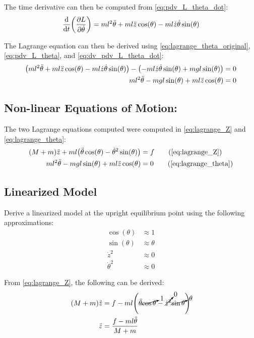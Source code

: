 \documentclass[]{article}
\begin{document}
		The time derivative can then be computed from \eqref{eq:pdv_L_theta_dot}:
		\begin{equation}
			\dv{t} \qty(\pdv{L}{\dot{\theta}}) = m l^2 \ddot{\theta} + m l \ddot{z} \cos(\theta) - m l \dot{z} \dot{\theta} \sin(\theta)
			\label{eq:dv_pdv_L_theta_dot}
		\end{equation}
		
		The Lagrange equation can then be derived using \eqref{eq:lagrange_theta_original}, \eqref{eq:pdv_L_theta}, and \eqref{eq:dv_pdv_L_theta_dot}:
		\begin{align}
			 \qty(m l^2 \ddot{\theta} + m l \ddot{z} \cos(\theta) - m l \dot{z} \dot{\theta} \sin(\theta)) - \qty(- m l \dot{z} \dot{\theta} \sin(\theta) + m g l \sin(\theta))= 0 \nonumber\\
			 m l^2 \ddot{\theta} - m g l \sin(\theta) + m l \ddot{z} \cos(\theta) = 0
			\label{eq:lagrange_theta}
		\end{align}

	\subsection{Non-linear Equations of Motion:}
	
		The two Lagrange equations computed were computed in \eqref{eq:lagrange_Z} and \eqref{eq:lagrange_theta}:
		\begin{align}
			(M+m)\ddot{z} + m l \qty(\ddot{\theta}\cos(\theta) - \dot{\theta}^2\sin(\theta)) &= f  \tag{\ref{eq:lagrange_Z}}\\
			m l^2 \ddot{\theta} - m g l \sin(\theta) + m l \ddot{z} \cos(\theta) &= 0
			\tag{\ref{eq:lagrange_theta}}
		\end{align}

	\subsection{Linearized Model}
		Derive a linearized model at the upright equilibrium point using the following approximations:
		\begin{align*}
			\cos(\theta) 	&\approx 1\\
			\sin(\theta) 	&\approx \theta\\
			\dot{z}^2		&\approx 0\\
			\dot{\theta}^2  &\approx 0
		\end{align*}
		
			From \eqref{eq:lagrange_Z}, the following can be derived:
			\begin{align}
				(M+m)\ddot{z} &= f -ml \qty(\ddot{\theta}\cancelto{1}{\cos{\theta}} - \cancelto{0}{\dot{z}^2}\cancelto{\theta}{\sin{\theta}} ) \nonumber\\
				\ddot{z} &= \frac{f -ml \ddot{\theta}}{M+m} \label{eq:z_lin_init}
			\end{align}
		
\end{document}
